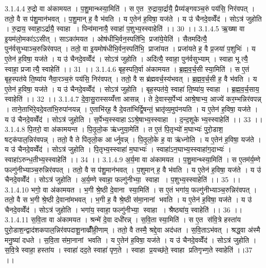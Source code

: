 3.1.4.4
रु॒द्रो वा अ॑कामयत । प॒शु॒मान्थ्स्या॒मिति॑ । स ए॒त रु॒द्राया॒र्द्रायै॒ प्रैय्य॑ङ्गवञ्च॒रुं पय॑सि॒ निर॑वपत् । ततो॒ वै स प॑शु॒मान॑भवत् । प॒शु॒मान् ह॒ वै भ॑वति । य ए॒तेन॑ ह॒विषा॒ यज॑ते । य उ॑ चैनदे॒वव्वेँद॑ । सोऽत्र॑ जुहोति । रु॒द्राय॒ स्वाहा॒ऽर्द्रायै॒ स्वाहा । पिन्व॑मानायै॒ स्वाहा॑ प॒शुभ्य॒स्स्वाहेति॑ ।। 30 ।।
3.1.4.5
ऋ॒ख्षा वा इ॒यम॑लो॒मका॑ऽऽसीत् । साऽका॑मयत । ओष॑धीभि॒र्वन॒स्पति॑भि॒ प्रजा॑ये॒येति॑ । सैतमदि॑त्यै॒ पुन॑र्वसुभ्याञ्च॒रुन्निर॑वपत् । ततो॒ वा इ॒यमोष॑धीभि॒र्वन॒स्पति॑भि॒ प्राजा॑यत । प्रजा॑यते ह॒ वै प्र॒जया॑ प॒शुभिः॑ । य ए॒तेन॑ ह॒विषा॒ यज॑ते । य उ॑ चैनदे॒वव्वेँद॑ । सोऽत्र॑ जुहोति । अदि॑त्यै॒ स्वाहा॒ पुन॑र्वसुभ्याम् । स्वाहा भूत्यै॒ स्वाहा॒ प्रजात्यै॒ स्वाहेति॑ ।। 31 ।।
3.1.4.6
बृह॒स्पति॒र्वा अ॑कामयत । ब्र॒ह्म॒व॒र्च॒सी स्या॒मिति॑ । स ए॒तं बृह॒स्पत॑ये ति॒ष्या॑य नैवा॒रञ्च॒रुं पय॑सि॒ निर॑वपत् । ततो॒ वै स ब्र॑ह्मवर्च॒स्य॑भवत् । ब्र॒ह्म॒व॒र्च॒सी ह॒ वै भ॑वति । य ए॒तेन॑ ह॒विषा॒ यज॑ते । य उ॑ चैनदे॒वव्वेँद॑ । सोऽत्र॑ जुहोति । बृह॒स्पत॑ये॒ स्वाहा॑ ति॒ष्या॑य॒ स्वाहा । ब्र॒ह्म॒व॒र्च॒साय॒ स्वाहेति॑ ।। 32 ।।
3.1.4.7
दे॒वा॒सु॒रास्सय्यँ॑त्ता आसन्न् । ते दे॒वास्स॒र्पेभ्य॑ आश्रे॒षाभ्य॒ आज्ये॑ कर॒म्भन्निर॑वपन्न् । ताने॒ताभि॑रे॒वदे॒वता॑भि॒रुपा॑नयन्न् । ए॒ताभि॑र्‌ह॒ वै दे॒वता॑भिर्द्वि॒षन्तं॒ भ्रातृ॑व्य॒मुप॑नयति । य ए॒तेन॑ ह॒विषा॒ यज॑ते । य उ॑ चैनदे॒वव्वेँद॑ । सोऽत्र॑ जुहोति । स॒र्पेभ्य॒स्स्वाहाऽऽश्रे॒षाभ्य॒स्स्वाहा । द॒न्द॒शूकेभ्य॒स्स्वाहेति॑ ।। 33 ।।
3.1.4.8
पि॒तरो॒ वा अ॑कामयन्त । पि॒तृ॒लो॒क ऋ॑ध्नुया॒मेति॑ । त ए॒तं पि॒तृभ्यो॑ म॒घाभ्यः॑ पुरो॒डाश॒॒ षट्क॑पाल॒न्निर॑वपन्न् । ततो॒ वै ते पि॑तृलो॒क आर्ध्नुवन्न् । पि॒तृ॒लो॒के ह॒ वा ऋ॑ध्नोति । य ए॒तेन॑ ह॒विषा॒ यज॑ते । य उ॑ चैनदे॒वव्वेँद॑ । सोऽत्र॑ जुहोति । पि॒तृभ्य॒स्स्वाहा॑ म॒घाभ्यः॑ । स्वाहा॑ऽन॒घाभ्य॒स्स्वाहा॑ग॒दाभ्यः॑ । स्वाहा॑ऽरुन्ध॒तीभ्य॒स्स्वाहेति॑ ।। 34 ।।
3.1.4.9
अ॒र्य॒मा वा अ॑कामयत । प॒शु॒मान्थ्स्या॒मिति॑ । स ए॒तम॑र्य॒म्णे फल्गु॑नीभ्याञ्च॒रुन्निर॑वपत् । ततो॒ वै स प॑शु॒मान॑भवत् । प॒शुमान् ह॒ वै भ॑वति । य ए॒तेन॑ ह॒विषा॒ यज॑ते । य उ॑ चैनदे॒वव्वेँद॑ । सोऽत्र॑ जुहोति । अ॒र्य॒म्णे स्वाहा॒ फल्गु॑नीभ्या॒॒ स्वाहा । प॒शुभ्य॒स्स्वाहेति॑ ।। 35 ।।
3.1.4.10
भगो॒ वा अ॑कामयत । भ॒गी श्रे॒ष्ठी दे॒वाना॑ स्या॒मिति॑ । स ए॒तं भगा॑य॒ फल्गु॑नीभ्याञ्च॒रुन्निर॑वपत् । ततो॒ वै स भ॒गी श्रे॒ष्ठी दे॒वाना॑मभवत् । भ॒गी ह॒ वै श्रे॒ष्ठी स॑मा॒नानां भवति । य ए॒तेन॑ ह॒विषा॒ यज॑ते । य उ॑ चैनदे॒वव्वेँद॑ । सोऽत्र॑ जुहोति । भगा॑य॒ स्वाहा॒ फल्गु॑नीभ्या॒॒ स्वाहा । श्रैष्ठ्या॑य॒ स्वाहेति॑ ।। 36 ।।
3.1.4.11
स॒वि॒ता वा अ॑कामयत । श्रन्मे॑ दे॒वा दधी॑रन्न् । स॒वि॒ता स्या॒मिति॑ । स ए॒त स॑वि॒त्रे हस्ता॑य पुरो॒डाश॒न्द्वाद॑शकपाल॒न्निर॑वपदाशू॒नाव्व्रीँ॑ही॒णाम् । ततो॒ वै तस्मै॒ श्रद्दे॒वा अद॑धत । स॒वि॒ताऽभ॑वत् । श्रद्ध॒वा अ॑स्मै मनु॒ष्या॑ दधते । स॒वि॒ता स॑मा॒नानां भवति । य ए॒तेन॑ ह॒विषा॒ यज॑ते । य उ॑ चैनदे॒वव्वेँद॑ । सोऽत्र॑ जुहोति । स॒वि॒त्रे स्वाहा॒ हस्ता॑य । स्वाहा॑ दद॒ते स्वाहा॑ पृण॒ते । स्वाहा प्र॒यच्छ॑ते॒ स्वाहा प्रतिगृभ्ण॒ते स्वाहेति॑ ।।37 ।।
